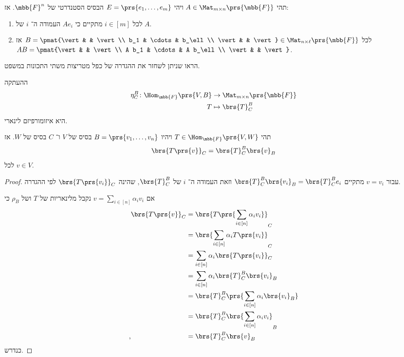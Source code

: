\documentclass[a4paper,10pt,twoside,openany]{book}
\begin{document}
\begin{theorem}
תהי
$A \in \Mat_{m \times n}\prs{\mbb{F}}$
ויהי
$E = \prs{e_1, \ldots, e_m}$
הבסיס הסטנדרטי של
$\mbb{F}^n$.
אז:
\begin{enumerate}[label = (\roman*)]
\item
לכל
$i \in [m]$
מתקיים כי
$A e_i$
העמודה ה־%
$i$
של
$A$.
\item
לכל
$B = \pmat{\vert & & \vert \\ b_1 & \cdots & b_\ell \\ \vert & & \vert} \in \Mat_{n \times \ell}\prs{\mbb{F}}$
אז
$AB = \pmat{\vert & & \vert \\ A b_1 & \cdots & A b_\ell \\ \vert & & \vert}$.
\end{enumerate}
\end{theorem}

\begin{exercise}
הראו שניתן לשחזר את ההגדרה של כפל מטריצות משתי התכונות במשפט.
\end{exercise}

\begin{remark}
ההעתקה
\begin{align*}
\eta^B_C \colon \Hom_{\mbb{F}}\prs{V,B} &\to \Mat_{m \times n}\prs{\mbb{F}} \\
T &\mapsto \brs{T}^B_C
\end{align*}
היא איזומורפיזם לינארי.
\end{remark}

\begin{proposition}
תהי
$T \in \Hom_{\mbb{F}}\prs{V,W}$
ויהיו
$B = \prs{v_1, \ldots, v_n}$
בסיס של
$V$
ו־%
$C$
בסיס של
$W$.
אז
\[\brs{T\prs{v}}_C = \brs{T}^B_C \brs{v}_B\]
לכל
$v \in V$.
\end{proposition}

\pagebreak
\begin{proof}
עבור
$v = v_i$
מתקיים
$\brs{T}^B_C \brs{v_i}_B = \brs{T}^B_C e_i$
וזאת העמודה ה־%
$i$
של
$\brs{T}^B_C$,
שהינה
$\brs{T\prs{v_i}}_C$
לפי ההגדרה.

אם
$v = \sum_{i \in [n]} \alpha_i v_i$
נקבל מלינאריות של
$T$
ושל
$\rho_B$
כי
\begin{align*}
\brs{T\prs{v}}_C &= \brs{T\prs{\sum_{i \in [n]} \alpha_i v_i}}_C
\\&= \brs{\sum_{i \in [n]} \alpha_i T\prs{v_i}}_C
\\&= \sum_{i \in [n]} \alpha_i \brs{T\prs{v_i}}_C
\\&= \sum_{i \in [n]} \alpha_i \brs{T}^B_C \brs{v_i}_B
\\&= \brs{T}^B_C \prs{\sum_{i \in [n]} \alpha_i \brs{v_i}_B}
\\&= \brs{T}^B_C \brs{\sum_{i \in [n]} \alpha_i v_i}_B
\\\text{,} \hphantom{\brs{T\prs{v}}_C} &= \brs{T}^B_C \brs{v}_B
\end{align*}
כנדרש.
\end{proof}
\end{document}
